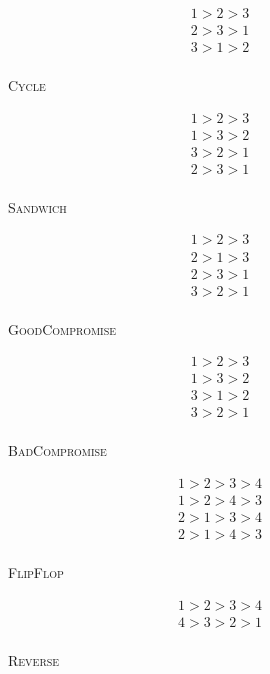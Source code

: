 \documentclass[12pt]{article}
\newcommand{\1}[1]{\mathds{1}[{#1}]}
\begin{document}
  \begin{wrapfigure}{r}{0.2\textwidth}
    \begin{center}
      \vspace{-0.5in}
      \begin{align*}
        1 > 2 > 3 \\
        2 > 3 > 1 \\
        3 > 1 > 2 \\
      \end{align*}
      \caption*{\textsc{Cycle}}
      \vspace{-0.25in}
      \begin{align*}
        1 > 2 > 3 \\
        1 > 3 > 2 \\
        3 > 2 > 1 \\
        2 > 3 > 1 \\
      \end{align*}
      \caption*{\textsc{Sandwich}}
      \vspace{-0.25in}
      \begin{align*}
        1 > 2 > 3 \\
        2 > 1 > 3 \\
        2 > 3 > 1 \\
        3 > 2 > 1 \\
      \end{align*}
      \caption*{\textsc{GoodCompromise}}
      \vspace{-0.25in}
      \begin{align*}
        1 > 2 > 3 \\
        1 > 3 > 2 \\
        3 > 1 > 2 \\
        3 > 2 > 1 \\
      \end{align*}
      \caption*{\textsc{BadCompromise}}
      \vspace{-0.25in}
      \begin{align*}
        1 > 2 > 3 > 4 \\
        1 > 2 > 4 > 3 \\
        2 > 1 > 3 > 4 \\
        2 > 1 > 4 > 3 \\
      \end{align*}
      \caption*{\textsc{FlipFlop}}
      \vspace{-0.25in}
      \begin{align*}
        1 > 2 > 3 > 4 \\
        4 > 3 > 2 > 1 \\
      \end{align*}
      \caption*{\textsc{Reverse}}
    \end{center}
  \end{wrapfigure}
\end{document}
